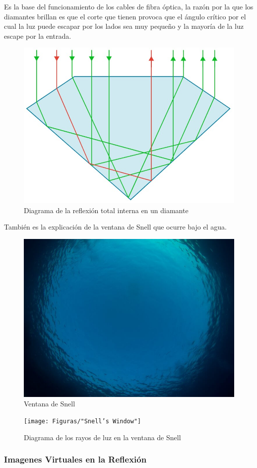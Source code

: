 \documentclass{article}
\begin{document}
Es la base del funcionamiento de los cables de fibra óptica, la razón por la que los diamantes brillan es que el corte que tienen provoca que el ángulo crítico por el cual la luz puede escapar por los lados sea muy pequeño y la mayoría de la luz escape por la entrada.

\begin{figure}[H]
	\centering
	\includegraphics[width=0.45\linewidth]{Figuras/Diamond}
	\caption{Diagrama de la reflexión total interna en un diamante}
	\label{fig:diamond}
\end{figure}

\pagebreak

También es la explicación de la ventana de Snell que ocurre bajo el agua.

\begin{figure}[H]
	\centering
	\includegraphics[width=0.6\linewidth]{Figuras/Snell's_Window_2}
	\caption{Ventana de Snell}
	\label{fig:snellswindow2}
\end{figure}

\begin{figure}[H]
	\centering
	\texttt{[image: Figuras/"Snell's Window"]}
	\caption{Diagrama de los rayos de luz en la ventana de Snell}
	\label{fig:snells-window}
\end{figure}



\subsubsection{Imagenes Virtuales en la Reflexión}
\end{document}
